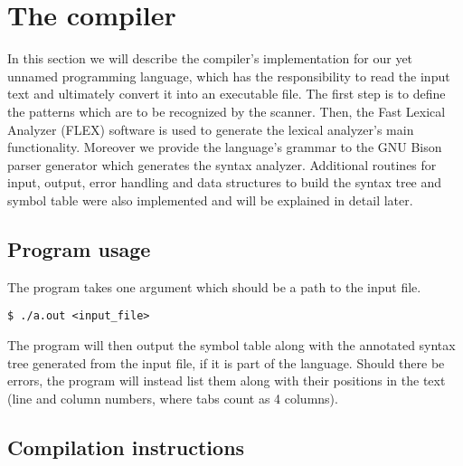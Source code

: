 \section{The compiler}
In this section we will describe the compiler's implementation for our yet unnamed programming
language, which has the responsibility to read the input text and ultimately convert it into an
executable file. The first step is to define the patterns which are to be recognized by the scanner.
Then, the Fast Lexical Analyzer (FLEX) \cite{FLEX} software is used to generate the lexical
analyzer's main functionality. Moreover we provide the language's grammar to the GNU Bison parser
generator \cite{BISON} which generates the syntax analyzer. Additional routines for input, output,
error handling and data structures to build the syntax tree and symbol table were also implemented
and will be explained in detail later.


\subsection{Program usage}
The program takes one argument which should be a path to the input file.

\begin{lstlisting}
$ ./a.out <input_file>
\end{lstlisting}

The program will then output the symbol table along with the
annotated syntax tree generated from the input file, if it is part of the language.
Should there be errors, the program will instead list them along with their
positions in the text (line and column numbers, where tabs count as 4 columns).

\subsection{Compilation instructions}

